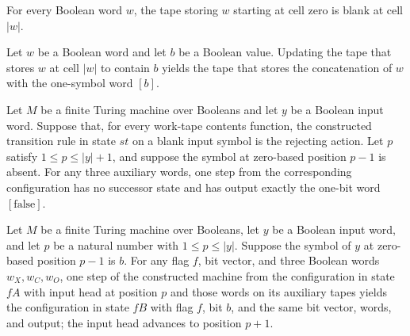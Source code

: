 \begin{theorem}
\label{Complexity.Meyer.bufferTape_length}
\leanok
{}
For every Boolean word $w$, the tape storing $w$ starting at cell zero is blank at cell
$|w|$.
\end{theorem}

\begin{theorem}
\label{Complexity.Meyer.bufferTape_write}
\leanok
{}
Let $w$ be a Boolean word and let $b$ be a Boolean value. Updating the tape that stores
$w$ at cell $|w|$ to contain $b$ yields the tape that stores the concatenation of $w$
with the one-symbol word $[b]$.
\end{theorem}

\begin{theorem}
\label{Complexity.Meyer.pcfg_reject}
\leanok
{}
Let $M$ be a finite Turing machine over Booleans and let $y$ be a Boolean input word.
Suppose that, for every work-tape contents function, the constructed transition rule in
state $st$ on a blank input symbol is the rejecting action. Let $p$ satisfy $1\le p\le
|y|+1$, and suppose the symbol at zero-based position $p-1$ is absent. For any three
auxiliary words, one step from the corresponding configuration has no successor state
and has output exactly the one-bit word $[\mathrm{false}]$.
\end{theorem}

\begin{theorem}
\label{Complexity.Meyer.pcfg_fA}
\leanok
{}
Let $M$ be a finite Turing machine over Booleans, let $y$ be a Boolean input word, and
let $p$ be a natural number with $1\le p\le |y|$. Suppose the symbol of $y$ at
zero-based position $p-1$ is $b$. For any flag $f$, bit vector, and three Boolean words
$w_X,w_C,w_O$, one step of the constructed machine from the configuration in state $fA$
with input head at position $p$ and those words on its auxiliary tapes yields the
configuration in state $fB$ with flag $f$, bit $b$, and the same bit vector, words, and
output; the input head advances to position $p+1$.
\end{theorem}

